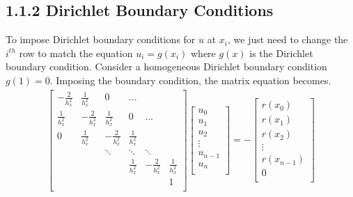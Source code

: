 \documentclass[11pt, letterpaper, hidelinks]{article}
\theoremstyle{definition}
\begin{document}
\subsection{1.1.2 Dirichlet Boundary Conditions}
To impose Dirichlet boundary conditions for $u$ at $x_i$, we just need to change the $i^{th}$ row to match the equation $u_i = g(x_i)$ where $g(x)$ is the Dirichlet boundary condition. Consider a homogeneous Dirichlet boundary condition $g(1) = 0$. Imposing the boundary condition, the matrix equation becomes.
\begin{align*}
    \left[
        \begin{array}{cccccc}
            -\frac{2}{h_x^2} & \frac{1}{h_x^2}  & 0                & ...             &                  &                 \\
            \frac{1}{h_x^2}  & -\frac{2}{h_x^2} & \frac{1}{h_x^2}  & 0               & ...              &                 \\
            0                & \frac{1}{h_x^2}  & -\frac{2}{h_x^2} & \frac{1}{h_x^2} &                  &                 \\
                             &                  & \ddots           & \ddots          & \ddots           &                 \\
                             &                  &                  & \frac{1}{h_x^2} & -\frac{2}{h_x^2} & \frac{1}{h_x^2} \\
                             &                  &                  &                 &                  & 1               \\
        \end{array}
        \right]
    \left[
        \begin{array}{cccccc}
            u_0 \\ u_1 \\ u_2 \\ \vdots \\ u_{n-1} \\ u_{n} \\
        \end{array}
        \right]
    = -
    \left[
        \begin{array}{cccccc}
            r(x_0) \\ r(x_1) \\ r(x_2) \\ \vdots \\ r(x_{n-1}) \\ 0 \\
        \end{array}
        \right]
\end{align*}
\end{document}
